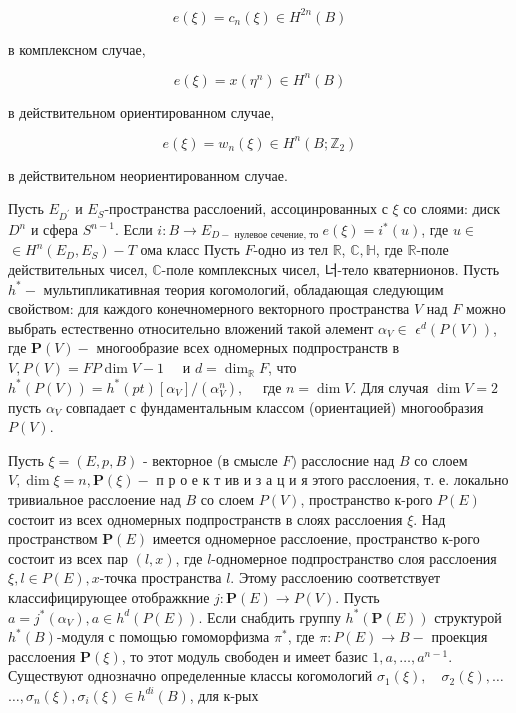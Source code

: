 \documentclass[10pt]{article}
\begin{document}
\[

e(\xi)=c_{n}(\xi) \in H^{2 n}(B)

\]



в комплексном случае,



\[

e(\xi)=x\left(\eta^{n}\right) \in H^{n}(B)

\]



в действительном ориентированном случае,



\[

e(\xi)=w_{n}(\xi) \in H^{n}\left(B ; \mathbb{Z}_{2}\right)

\]



в действительном неориентированном случае.



Пусть $E_{D^{\prime}}$ и $E_{S}$-пространства расслоений, ассоцинрованных с $\xi$ со слоями: диск $D^{n}$ и сфера $S^{n-1}$. Если $i: B \longrightarrow E_{D-\text { нулевое сечение, то }} e(\xi)=i^{*}(u)$, где $u \in$ $\in H^{n}\left(E_{D}, E_{S}\right)-T$ ома класс Пусть $F$-одно из тел $\mathbb{R}$, $\mathbb{C}, \mathbb{H}$, где $\mathbb{R}$-поле действительных чисел, $\mathbb{C}$-поле комплексных чисел, 너-тело кватернионов. Пусть $h^{*}-$ мультипликативная теория когомологий, обладающая следующим свойством: для каждого конечномерного векторного пространства $V$ над $F$ можно выбрать естественно относительно вложений такой әлемент $\alpha_{V} \in$ $\epsilon^{d}(P(V))$, где $\boldsymbol{P}(V)-$ многообразие всех одномерных подпространств в $V, P(V)=F P \operatorname{dim} V-1 \quad$ и $d=\operatorname{dim}_{\mathbb{R}} F$, что $h^{*}(P(V))=h^{*}(p t)\left[\alpha_{V}\right] /\left(\alpha_{V}^{n}\right), \quad$ где $n=\operatorname{dim} V$. Для случая $\operatorname{dim} V=2$ пусть $\alpha_{V}$ совпадает с фундаментальным классом (ориентацией) многообразия $P(V)$.



Пусть $\xi=(E, p, B)$ - векторное (в смысле $F)$ расслосние над $B$ со слоем $V, \operatorname{dim} \xi=n, \boldsymbol{P}(\xi)-$ п р о е к т ив и з а ц и я этого расслоения, т. е. локально тривиальное расслоение над $B$ со слоем $P(V)$, пространство к-рого $P(E)$ состоит из всех одномерных подпространств в слоях расслоения $\xi$. Над пространством $\boldsymbol{P}(E)$ имеется одномерное расслоение, пространство к-рого состоит из всех пар $(l, x)$, где $l$-одномерное подпространство слоя расслоения $\xi, l \in P(E), x$-точка пространства $l$. Этому расслоению соответствует классифицирующее отображкние $j: \boldsymbol{P}(E) \longrightarrow P(V)$. Пусть $a=j^{*}\left(\alpha_{V}\right), a \in h^{d}(P(E))$. Если снабдить группу $h^{*}(\boldsymbol{P}(E))$ структурой $h^{*}(B)$-модуля с помощью гомоморфизма $\pi^{*}$, где $\pi: P(E) \rightarrow B-$ проекция расслоения $\boldsymbol{P}(\xi)$, то этот модуль свободен и имеет базис $1, a, \ldots, a^{n-1}$. Существуют однозначно определенные классы когомологий $\sigma_{1}(\xi), \quad \sigma_{2}(\xi), \ldots$ $\ldots, \sigma_{n}(\xi), \sigma_{i}(\xi) \in h^{d i}(B)$, для к-рых
\end{document}
